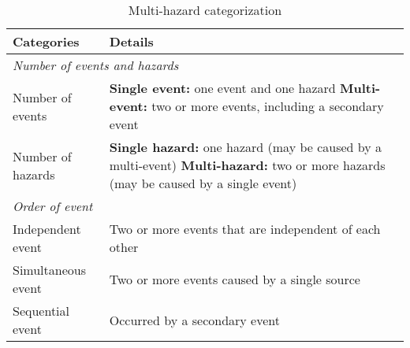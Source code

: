 \begin{table}[htbp]
\centering
\caption{Multi-hazard categorization}
\label{tab:MultiHazardCat}
\begin{tabular}{lp{}}
\toprule
\textbf{Categories}                 & \textbf{Details}                                                             \\
\midrule
\multicolumn{2}{l}{\textit{Number of events and hazards}}  \\
Number of events & \textbf{Single event:} one event and one hazard\newline
\textbf{Multi-event:} two or more events, including a secondary event \\[6pt]
Number of hazards & \textbf{Single hazard:} one hazard (may be caused by a multi-event)\newline
\textbf{Multi-hazard:} two or more hazards (may be caused by a single event) \\[6pt]
\multicolumn{2}{l}{\textit{Order of event}} \\
Independent event & Two or more events that are independent of each other \\[6pt]
Simultaneous event& Two or more events caused by a single source \\[6pt]
Sequential event & Occurred by a secondary event \\
\bottomrule
\end{tabular}
\end{table}

